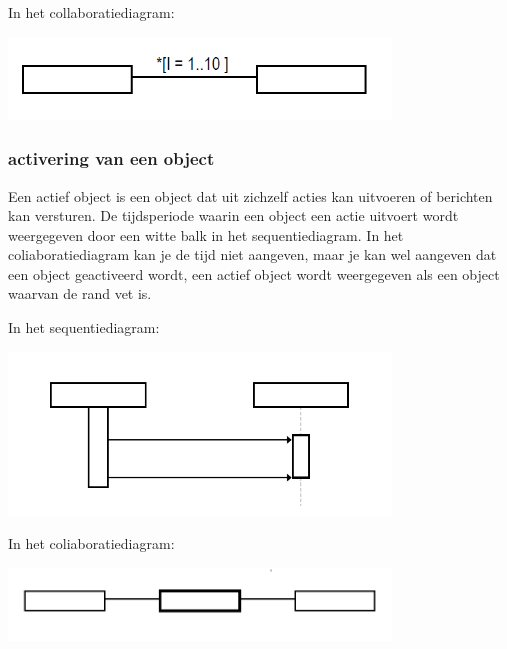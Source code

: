 In het collaboratiediagram:


\begin{center}
\includegraphics[width=4in]{img/iter2}%
\end{center}

\subsubsection{activering van een object}

Een actief object is een object dat uit zichzelf acties kan uitvoeren of berichten kan versturen.
De tijdsperiode waarin een object een actie uitvoert wordt weergegeven door een witte balk in het sequentiediagram. In het coliaboratiediagram kan je de tijd niet aangeven, maar je kan wel aangeven dat een object geactiveerd wordt, een actief object wordt weergegeven als een object waarvan de rand vet is.

In het sequentiediagram:


\begin{center}
\includegraphics[width=4in]{img/activ1}%
\end{center}

In het coliaboratiediagram:


\begin{center}
\includegraphics[width=4in]{img/activ2}%
\end{center}

